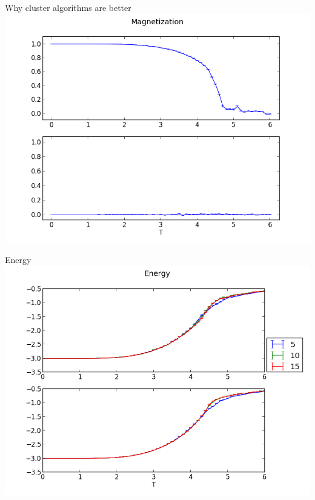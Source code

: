 \documentclass[]{beamer}
\begin{document}
\begin{frame}{Why cluster algorithms are better}
\includegraphics[width=\textwidth]{img/comp_magnetization.png}
\note{ }
\end{frame}

\begin{frame}{Energy}
\includegraphics[width=\textwidth]{../results/measurements/energy.png}
\note{ }
\end{frame}
\end{document}
